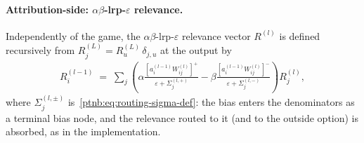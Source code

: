 \paragraph{Attribution-side: \texorpdfstring{$\alpha\beta$-\ac{lrp}-$\varepsilon$}{alpha-beta-LRP-epsilon} relevance.}
Independently of the game, the $\alpha\beta$-\ac{lrp}-$\varepsilon$ relevance vector
$R^{(l)}$ is defined recursively from $R^{(L)}_j = R_u^{(L)}\,\delta_{j,u}$ at the output by
\begin{align}\label{ptnb:eq:lrp-eps-recursion}
    R^{(l-1)}_i \;=\; \sum_j \left(
    \alpha \frac{[a_i^{(l-1)} W_{ij}^{(l)}]^+}{\varepsilon + \Sigma_j^{(l,+)}}
    -
    \beta \frac{[a_i^{(l-1)} W_{ij}^{(l)}]^-}{\varepsilon + \Sigma_j^{(l,-)}}
    \right) R^{(l)}_j,
\end{align}
where $\Sigma_j^{(l,\pm)}$ is~\eqref{ptnb:eq:routing-sigma-def}: the bias enters the denominators as a
terminal bias node, and the relevance routed to it (and to the outside option) is absorbed, as in
the implementation. 

